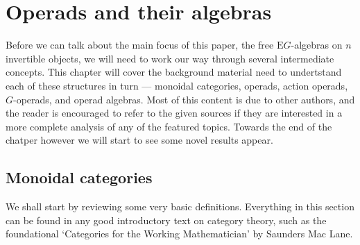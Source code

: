 \chapter{Operads and their algebras} \label{actionoperad} 

Before we can talk about the main focus of this paper, the free $\mathrm{E}G$-algebras on $n$ invertible objects, we will need to work our way through several intermediate concepts. This chapter will cover the background material need to undertstand each of these structures in turn --- monoidal categories, operads, action operads, $G$-operads, and operad algebras. Most of this content is due to other authors, and the reader is encouraged to refer to the given sources if they are interested in a more complete analysis of any of the featured topics. Towards the end of the chatper however we will start to see some novel results appear.

\section{Monoidal categories}

We shall start by reviewing some very basic definitions. Everything in this section can be found in any good introductory text on category theory, such as the foundational `Categories for the Working Mathematician' \cite{cwm} by Saunders Mac Lane.

